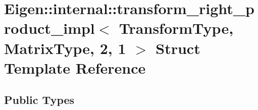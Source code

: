 \hypertarget{struct_eigen_1_1internal_1_1transform__right__product__impl_3_01_transform_type_00_01_matrix_type_00_012_00_011_01_4}{}\section{Eigen\+:\+:internal\+:\+:transform\+\_\+right\+\_\+product\+\_\+impl$<$ Transform\+Type, Matrix\+Type, 2, 1 $>$ Struct Template Reference}
\label{struct_eigen_1_1internal_1_1transform__right__product__impl_3_01_transform_type_00_01_matrix_type_00_012_00_011_01_4}
\subsection*{Public Types}
